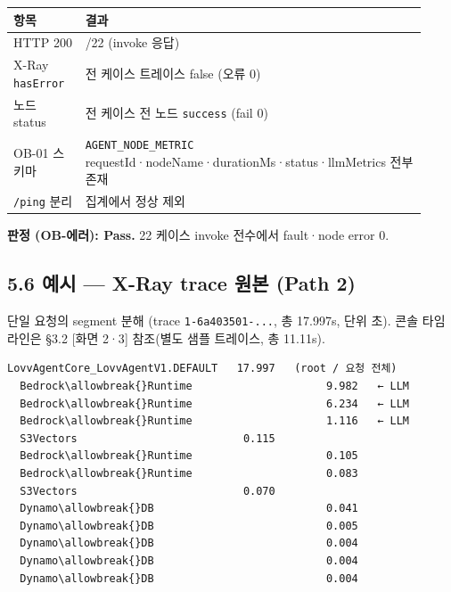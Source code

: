 \documentclass[11pt,a4paper]{article}
\newcommand{\DocNeedspace}[1]{\par\ifdim\dimexpr\pagegoal-\pagetotal\relax<#1\newpage\fi}
\begin{document}
\begin{small}
\begin{longtable}{@{}>{\RaggedRight\arraybackslash}m{0.160\linewidth}>{\RaggedRight\arraybackslash}m{0.760\linewidth}@{}}
\toprule\noalign{}
항목 & 결과 \\
\midrule\noalign{}
\endhead
\bottomrule\noalign{}
\endlastfoot
HTTP 200 & 22/22 (invoke 응답) \\
X-Ray \texttt{hasError} & 전 케이스 트레이스 false (오류 0) \\
노드 status & 전 케이스 전 노드 \texttt{success} (fail 0) \\
OB-01 스키마 & \texttt{AGENT\_\allowbreak{}NODE\_\allowbreak{}METRIC} requestId·nodeName·durationMs·status·llmMetrics 전부 존재 \\
\texttt{/\allowbreak{}ping} 분리 & 집계에서 정상 제외 \\
\end{longtable}
\end{small}

\textbf{판정 (OB-에러): Pass.} 22 케이스 invoke 전수에서 fault·node error 0.

\DocNeedspace{6\baselineskip}
\subsection*{5.6 예시 --- X-Ray trace 원본 (Path 2)}

단일 요청의 segment 분해 (trace \texttt{1-\allowbreak{}6a403501-\allowbreak{}.\allowbreak{}.\allowbreak{}.\allowbreak{}}, 총 17.997s, 단위 초). 콘솔 타임라인은 §3.2 {[}화면 2·3{]} 참조(별도 샘플 트레이스, 총 11.11s).

\begin{verbatim}
LovvAgentCore_LovvAgentV1.DEFAULT   17.997   (root / 요청 전체)
  Bedrock\allowbreak{}Runtime                     9.982   ← LLM
  Bedrock\allowbreak{}Runtime                     6.234   ← LLM
  Bedrock\allowbreak{}Runtime                     1.116   ← LLM
  S3Vectors                          0.115
  Bedrock\allowbreak{}Runtime                     0.105
  Bedrock\allowbreak{}Runtime                     0.083
  S3Vectors                          0.070
  Dynamo\allowbreak{}DB                           0.041
  Dynamo\allowbreak{}DB                           0.005
  Dynamo\allowbreak{}DB                           0.004
  Dynamo\allowbreak{}DB                           0.004
  Dynamo\allowbreak{}DB                           0.004
\end{verbatim}
\end{document}
